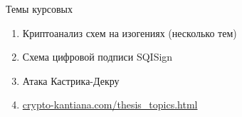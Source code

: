 \documentclass{beamer}
\begin{document}
\begin{frame}{Темы курсовых}
	\begin{enumerate}
		\item Криптоанализ схем на изогениях (несколько тем)
		\item Схема цифровой подписи SQISign
		\item Атака Кастрика-Декру
		\item \href{https://crypto-kantiana.com/thesis_topics.html}{crypto-kantiana.com/thesis\_topics.html}
	\end{enumerate}
\end{frame}
\end{document}
